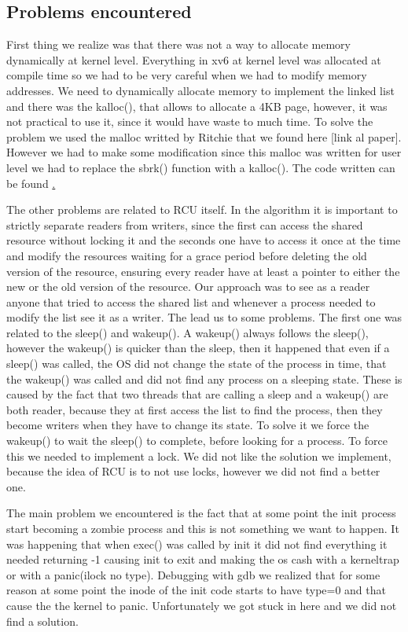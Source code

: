 \documentclass{article}
\begin{document}
\subsection{Problems encountered}

First thing we realize was that there was not a way to allocate memory dynamically at kernel level. Everything in xv6 at kernel level was allocated at compile time so we had to be very careful when we had to modify memory addresses. We need to dynamically allocate memory to implement the linked list and there was the kalloc(), that allows to allocate a 4KB page, however, it was not practical to use it, since it would have waste to much time. To solve the problem we used the malloc writted by Ritchie that we found here [link al paper]. However we had to make some modification since this malloc was written for user level we had to replace the sbrk() function with a kalloc(). The code written can be found \href{link al codice}.

The other problems are related to RCU itself. In the algorithm it is important to strictly separate readers from writers, since the first can access the shared resource without locking it and the seconds one have to access it once at the time and modify the resources waiting for a grace period before deleting the old version of the resource, ensuring every reader have at least a pointer to either the new or the old version of the resource.
Our approach was to see as a reader anyone that tried to access the shared list and whenever a process needed to modify the list see it as a writer. The lead us to some problems.
The first one was related to the sleep() and wakeup(). A wakeup() always follows the sleep(), however the wakeup() is quicker than the sleep, then it happened that even if a sleep() was called, the OS did not change the state of the process in time, that the wakeup() was called and did not find any process on a sleeping state. These is caused by the fact that two threads that are calling a sleep and a wakeup() are both reader, because they at first access the list to find the process, then they become writers when they have to change its state. To solve it we force the  wakeup() to wait the sleep()  to complete, before looking for a process. To force this we needed to implement a lock. We did not like the solution we implement, because the idea of RCU is to not use locks, however we did not find a better one.

The main problem we encountered is the fact that at some point the init process start becoming a zombie process and this is not something we want to happen. It was happening that when exec() was called by init it did not find everything it needed returning -1 causing init to exit and making the os cash with a kerneltrap or with a panic(ilock no type). Debugging with gdb we realized that for some reason at some point the inode of the init code starts to have type=0 and that cause the the kernel to panic. Unfortunately we got stuck in here and we did not find a solution.
\end{document}
